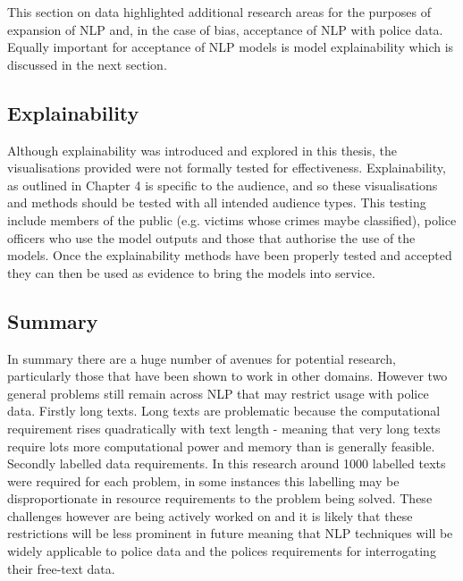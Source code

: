 This section on data highlighted additional research areas for the purposes of expansion of NLP and, in the case of bias, acceptance of NLP with police data. Equally important for acceptance of NLP models is model explainability which is discussed in the next section. 

\subsection{Explainability} Although explainability was introduced and explored in this thesis, the visualisations provided were not formally tested for effectiveness. Explainability, as outlined in Chapter 4 is specific to the audience, and so these visualisations and methods should be tested with all intended audience types. This testing include members of the public (e.g. victims whose crimes maybe classified), police officers who use the model outputs and those that authorise the use of the models. Once the explainability methods have been properly tested and accepted they can then be used as evidence to bring the models into service.

\subsection{Summary} In summary there are a huge number of avenues for potential research, particularly those that have been shown to work in other domains. However two general problems still remain across NLP that may restrict usage with police data. Firstly long texts. Long texts are problematic because the computational requirement rises quadratically with text length - meaning that very long texts require lots more computational power and memory than is generally feasible. Secondly labelled data requirements. In this research around 1000 labelled texts were required for each problem, in some instances this labelling may be disproportionate in resource requirements to the problem being solved.  These challenges however are being actively worked on and it is likely that these restrictions will be less prominent in future meaning that NLP techniques will be widely applicable to police data and the polices requirements for interrogating their free-text data.


